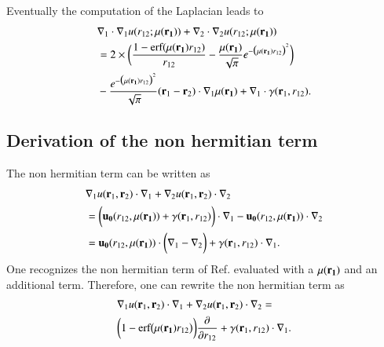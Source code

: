 \documentclass[aip,jcp,reprint,noshowkeys,superscriptaddress]{revtex4-1}
\newcommand{\deriv}[3]{\frac{\partial^{#3} #1}{\partial {#2}^{#3}}}
\newcommand{\br}[0]{{\bf {r}}}
\newcommand{\bri}[1]{{\bf r}_{#1}}
\newcommand{\mur}[1]{\mu({\bf r_{#1}})}
\begin{document}
Eventually the computation of the Laplacian leads to 
\begin{equation}
 \begin{aligned}
 &\nabla_1 \cdot \nabla_1 u(r_{12};\mur{1}) + \nabla_2 \cdot \nabla_2 u(r_{12};\mur{1}) \\ 
 & =  2 \times \bigg( \frac{1 - \text{erf}(\mur{1} r_{12})}{r_{12}} - \frac{\mur{1}}{\sqrt{\pi}} e^{-\big(\mur{1} r_{12} \big)^2}  \bigg) \\
 & -\frac{e^{-\big( \mur{1} r_{12}\big)^2}}{\sqrt{\pi}}(\br_1 - \br_2) \cdot \nabla_1 \mur{1} + \nabla_1 \cdot {\bf \gamma}(\br_1, r_{12}).
 \end{aligned}
\end{equation}


\subsection{Derivation of the non hermitian term}
The non hermitian term can be written as 
\begin{equation}
 \begin{aligned}
&  \nabla_1 u(\bri{1},\bri{2}) \cdot \nabla_1 + \nabla_2 u(\bri{1},\bri{2}) \cdot \nabla_2 \\
& = \bigg( {\bf u_0}(r_{12},\mur{1}) + {\bf \gamma}(\br_1, r_{12}) \bigg) \cdot \nabla_1 - {\bf u_0}(r_{12},\mur{1}) \cdot \nabla_2 \\
& = {\bf u_0}(r_{12},\mur{1}) \cdot \bigg( \nabla_1 - \nabla_2 \bigg) + {\bf \gamma}(\br_1, r_{12}) \cdot \nabla_1. 
 \end{aligned}
\end{equation}
One recognizes the non hermitian term of Ref.  evaluated with a $\mur{1}$ and an additional term. 
Therefore, one can rewrite the non hermitian term as 
\begin{equation}
 \begin{aligned}
 &\nabla_1 u(\bri{1},\bri{2}) \cdot \nabla_1 + \nabla_2 u(\bri{1},\bri{2}) \cdot \nabla_2 = \\
& \bigg( 1 - \text{erf}\big(\mur{1} r_{12} \big) \bigg) \deriv{}{r_{12}}{} + {\bf \gamma}(\br_1, r_{12}) \cdot \nabla_1. 
 \end{aligned}
\end{equation}
\end{document}
